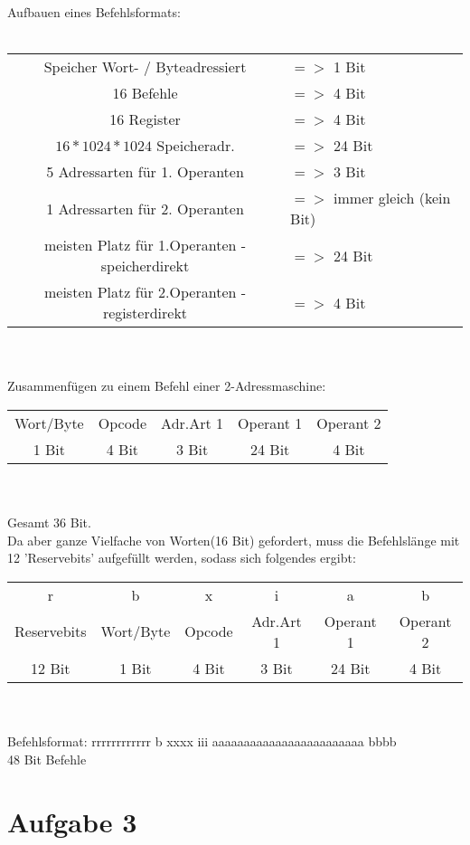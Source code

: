 \documentclass[12pt,a4paper]{scrartcl}
\begin{document}
	Aufbauen eines Befehlsformats: \\
	\\
	\begin{tabular}{c l}
		Speicher Wort- / Byteadressiert &$=>$ 1 Bit\\
		16 Befehle &$=>$ 4 Bit \\
		16 Register &$=>$ 4 Bit \\
		$16*1024*1024$ Speicheradr. &$=>$ 24 Bit \\
		5 Adressarten für 1. Operanten &$=>$ 3 Bit \\
		1 Adressarten für 2. Operanten &$=>$ immer gleich (kein Bit) \\
		meisten Platz für 1.Operanten - speicherdirekt &$=>$ 24 Bit \\
		meisten Platz für 2.Operanten - registerdirekt &$=>$ 4 Bit \\
	\end{tabular} \\
	\\
	Zusammenfügen zu einem Befehl einer 2-Adressmaschine: \\
	\begin{tabular}{c | c | c | c | c}
		Wort/Byte & Opcode & Adr.Art 1 & Operant 1 & Operant 2 \\
		1 Bit & 4 Bit & 3 Bit & 24 Bit & 4 Bit
	\end{tabular} \\
	\\
	Gesamt 36 Bit. \\
	Da aber ganze Vielfache von Worten(16 Bit) gefordert, muss die Befehlslänge mit 12  'Reservebits' aufgefüllt werden, sodass sich folgendes ergibt: \\
	\begin{tabular}{c | c | c | c | c | c}
		r & b & x & i & a & b \\
		Reservebits & Wort/Byte & Opcode & Adr.Art 1 & Operant 1 & Operant 2 \\
		12 Bit & 1 Bit & 4 Bit & 3 Bit & 24 Bit & 4 Bit
	\end{tabular} \\
	\\
	Befehlsformat: rrrrrrrrrrrr b xxxx iii aaaaaaaaaaaaaaaaaaaaaaaa bbbb \\
	48 Bit Befehle 
	
	\newpage
	
	\section*{Aufgabe 3}
	
\end{document}
